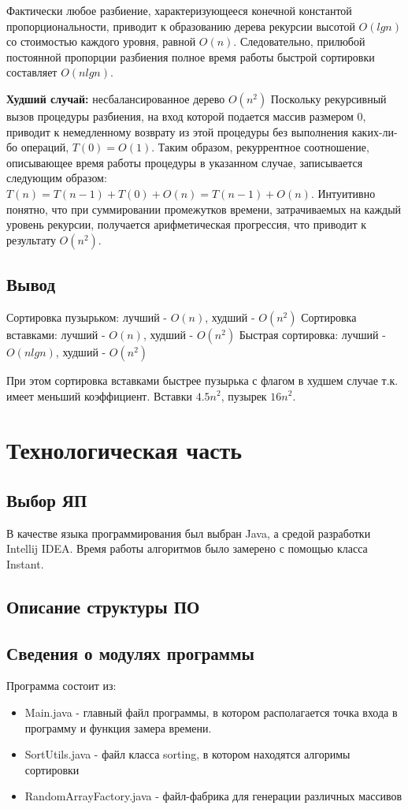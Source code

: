 \documentclass[12pt]{report}
\begin{document}
Фактически любое разбиение, характеризующееся конечной константой пропорциональности, приводит к образованию дерева рекурсии высотой $O(lgn)$ со стоимостью каждого уровня, равной $O(n)$. Следовательно, прилюбой постоянной пропорции разбиения полное время работы быстрой сортировки составляет $O(nlgn)$.

\textbf{Худший случай:} несбалансированное дерево $O(n^2)$
Поскольку рекурсивный вызов процедуры разбиения, на вход которой подается массив размером 0, приводит к немедленному возврату из этой процедуры без выполнения каких-ли-бо операций, $T(0) = O(1)$. Таким образом, рекуррентное соотношение, описывающее время работы процедуры в указанном случае, записывается следующим образом: 
$T(n) =T(n-1) +T(0) + O(n) =T(n-1) + O(n)$. Интуитивно понятно, что при суммировании промежутков времени, затрачиваемых на каждый уровень рекурсии, получается арифметическая прогрессия, что приводит к результату $O(n^2)$.

\section{Вывод}
Сортировка пузырьком: лучший - $O(n)$, худший - $O(n^2)$ \newline
Сортировка вставками: лучший - $O(n)$, худший - $O(n^2)$ \newline
Быстрая сортировка: лучший - $O(nlgn)$, худший - $O(n^2)$ \newline

При этом сортировка вставками быстрее пузырька с флагом в худшем случае т.к. имеет меньший коэффициент. Вставки $4.5n^2$, пузырек $16n^2$.


\chapter{Технологическая часть}
\section{Выбор ЯП}
В качестве языка программирования был выбран Java, а средой разработки Intellij IDEA.
Время работы алгоритмов было замерено с помощью класса Instant.

\section{Описание структуры ПО}

\section{Сведения о модулях программы}
Программа состоит из:
\begin{itemize}
	\item Main.java - главный файл программы, в котором располагается точка входа в программу и функция замера времени.
	\item SortUtils.java - файл класса sorting, в котором находятся алгоримы сортировки
	\item RandomArrayFactory.java - файл-фабрика для генерации различных массивов
\end{itemize}
\end{document}
